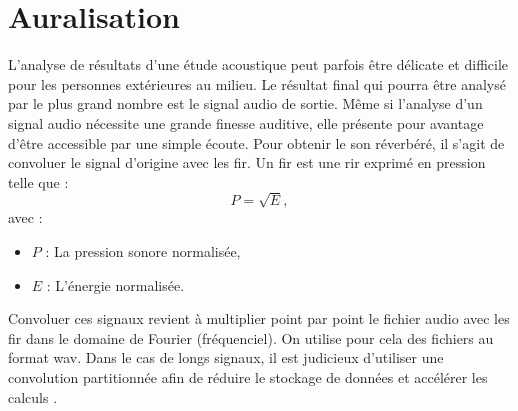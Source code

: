 


\section{Auralisation}
 \label{sect_TDS}

L'analyse de résultats d'une étude acoustique peut parfois être délicate et difficile pour les personnes extérieures au milieu. Le résultat final qui pourra être analysé par le plus grand nombre est le signal audio de sortie. Même si l'analyse d'un signal audio nécessite une grande finesse auditive, elle présente pour avantage d'être accessible par une simple écoute. Pour obtenir le son réverbéré, il s'agit de convoluer le signal d'origine avec les \gls{fir}. Un \gls{fir} est une \gls{rir} exprimé en pression telle que :
%
\begin{equation}
P = \sqrt{E},
\end{equation}
avec : 
\begin{itemize}
\item $P$ : La pression sonore normalisée,
\item $E$ : L'énergie normalisée.
\end{itemize}
%
Convoluer ces signaux revient à multiplier point par point le fichier audio avec les \gls{fir} dans le domaine de Fourier (fréquenciel).
On utilise pour cela des fichiers au format \gls{wav}. Dans le cas de longs signaux, il est judicieux d'utiliser une convolution partitionnée afin de réduire le stockage de données et accélérer les calculs \cite[2. Algorithm overview ]{partition}. 


